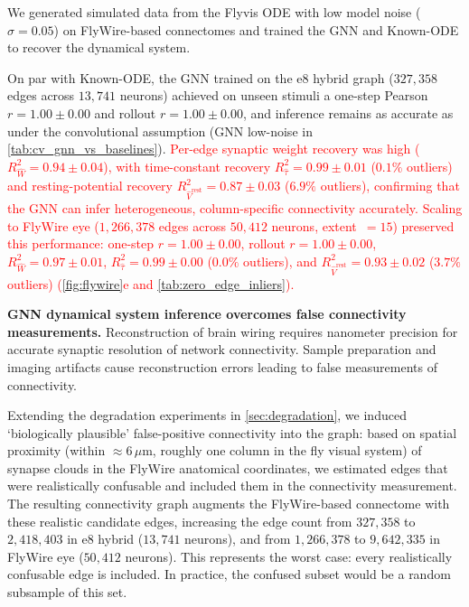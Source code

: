 \documentclass{article}
\begin{document}
We generated simulated data from the Flyvis ODE with low model noise ($\sigma=0.05$) on FlyWire-based connectomes and trained the GNN and Known-ODE to recover the dynamical system. 

On par with Known-ODE, the GNN trained on the e8 hybrid graph ($327{,}358$ edges across $13{,}741$ neurons) achieved on unseen stimuli a one-step Pearson $r = 1.00 \pm 0.00$ and rollout $r = 1.00 \pm 0.00$, and inference remains as accurate as under the convolutional assumption (GNN low-noise in \cref{tab:cv_gnn_vs_baselines}). \textcolor{red}{Per-edge synaptic weight recovery was high ($R^2_{\hat{W}} = 0.94 \pm 0.04$), with time-constant recovery $R^2_{\hat{\tau}} = 0.99 \pm 0.01$ ($0.1\%$ outliers) and resting-potential recovery $R^2_{\hat{V}^{\mathrm{rest}}} = 0.87 \pm 0.03$ ($6.9\%$ outliers), confirming that the GNN can infer heterogeneous, column-specific connectivity accurately.} \textcolor{red}{Scaling to FlyWire eye ($1{,}266{,}378$ edges across $50{,}412$ neurons, extent~$=15$) preserved this performance: one-step $r = 1.00 \pm 0.00$, rollout $r = 1.00 \pm 0.00$, $R^2_{\hat{W}} = 0.97 \pm 0.01$, $R^2_{\hat{\tau}} = 0.99 \pm 0.00$ ($0.0\%$ outliers), and $R^2_{\hat{V}^{\mathrm{rest}}} = 0.93 \pm 0.02$ ($3.7\%$ outliers) (\cref{fig:flywire}e and \cref{tab:zero_edge_inliers}).}

\textbf{GNN dynamical system inference overcomes false connectivity measurements.} Reconstruction of brain wiring requires nanometer precision for accurate synaptic resolution of network connectivity. Sample preparation and imaging artifacts cause reconstruction errors leading to false measurements of connectivity.

Extending the degradation experiments in \cref{sec:degradation}, we induced `biologically plausible' false-positive connectivity into the graph: based on spatial proximity (within $\approx\!6\,\mu$m, roughly one column in the fly visual system) of synapse clouds in the FlyWire anatomical coordinates, we estimated edges that were realistically confusable and included them in the connectivity measurement. The resulting connectivity graph augments the FlyWire-based connectome with these realistic candidate edges, increasing the edge count from $327{,}358$ to $2{,}418{,}403$ in e8 hybrid ($13{,}741$ neurons), and from $1{,}266{,}378$ to $9{,}642{,}335$ in FlyWire eye ($50{,}412$ neurons). This represents the worst case: every realistically confusable edge is included. In practice, the confused subset would be a random subsample of this set.
\end{document}
